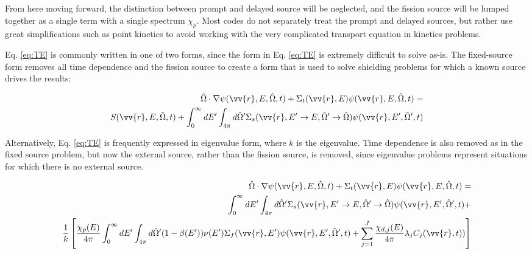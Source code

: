 \documentclass[10pt]{article}
\newcommand{\hO}{\hat{\Omega}}
\begin{document}
\begin{flushleft}
From here moving forward, the distinction between prompt and delayed source will be neglected, and the fission source will be lumped together as a single term with a single spectrum \(\chi_p\). Most codes do not separately treat the prompt and delayed sources, but rather use great simplifications such as point kinetics to avoid working with the very complicated transport equation in kinetics problems. 

Eq. \eqref{eq:TE} is commonly written in one of two forms, since the form in Eq. \eqref{eq:TE} is extremely difficult to solve as-is. The fixed-source form removes all time dependence and the fission source to create a form that is used to solve shielding problems for which a known source drives the results:

\begin{equation}
\label{eq:TE_fixedsource}
\begin{aligned}
 \hO  \cdot\nabla\psi(\vv{r}, E, \hO  ,t) + 
 \Sigma_t(\vv{r},E)\psi(\vv{r}, E, \hO  ,t) = \\
S(\vv{r}, E, \hO  ,t) + \int_{0}^{\infty}dE' \int_{4\pi}^{ } d\hO  ' \Sigma_s(\vv{r}, E'\rightarrow E, \hO  '\rightarrow\hO  )\psi(\vv{r}, E', \hO  ',t)\\
\end{aligned}
\end{equation}

Alternatively, Eq. \eqref{eq:TE} is frequently expressed in eigenvalue form, where \(k\) is the eigenvalue. Time dependence is also removed as in the fixed source problem, but now the external source, rather than the fission source, is removed, since eigenvalue problems represent situations for which there is no external source.

\begin{equation}
\label{eq:TE_eigenvalue}
\begin{aligned}
 \hO  \cdot\nabla\psi(\vv{r}, E, \hO  ,t) + 
 \Sigma_t(\vv{r},E)\psi(\vv{r}, E, \hO  ,t) = \\
\int_{0}^{\infty}dE' \int_{4\pi}^{ } d\hO  ' \Sigma_s(\vv{r}, E'\rightarrow E, \hO  '\rightarrow\hO  )\psi(\vv{r}, E', \hO  ',t) + \\
 \frac{1}{k}\left\lbrack\frac{\chi_p(E)}{4\pi} \int_{0}^{\infty} dE'\int_{4\pi}^{} d\hO  '(1-\beta(E'))\nu(E')\Sigma_f(\vv{r}, E')\psi(\vv{r}, E', \hO  ',t) + 
 \sum_{j = 1}^{J} \frac{\chi_{d,j}(E)}{4\pi} \lambda_j C_j(\vv{r}, t))\right\rbrack
\end{aligned}
\end{equation}


\end{flushleft}
\end{document}

